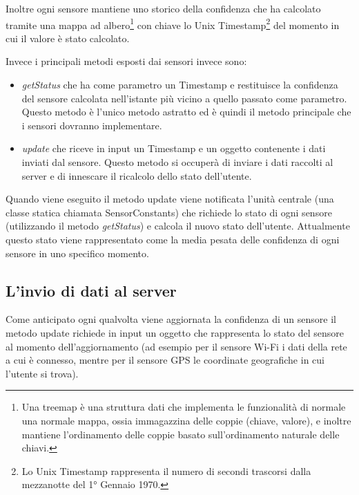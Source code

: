 Inoltre ogni sensore mantiene uno storico della confidenza che ha calcolato tramite una mappa ad albero\footnote{Una treemap è una struttura dati che implementa le funzionalità di normale una normale mappa, ossia immagazzina delle coppie (chiave, valore), e inoltre mantiene l'ordinamento delle coppie basato sull'ordinamento naturale delle chiavi.} con chiave lo Unix Timestamp\footnote{Lo Unix Timestamp rappresenta il numero di secondi trascorsi dalla mezzanotte del 1° Gennaio 1970.} del momento in cui il valore è stato calcolato.

Invece i principali metodi esposti dai sensori invece sono:
\begin{itemize}
    \item \textit{getStatus} che ha come parametro un Timestamp e restituisce la confidenza del sensore calcolata nell'istante più vicino a quello passato come parametro. Questo metodo è l'unico metodo astratto ed è quindi il metodo principale che i sensori dovranno implementare.
    \item \textit{update} che riceve in input un Timestamp e un oggetto contenente i dati inviati dal sensore. Questo metodo si occuperà di inviare i dati raccolti al server e di innescare il ricalcolo dello stato dell'utente.
\end{itemize}
Quando viene eseguito il metodo update viene notificata l'unità centrale (una classe statica chiamata SensorConstants) che richiede lo stato di ogni sensore (utilizzando il metodo \textit{getStatus}) e calcola il nuovo stato dell'utente. Attualmente questo stato viene rappresentato come la media pesata delle confidenza di ogni sensore in uno specifico momento.

\subsection{L'invio di dati al server}
Come anticipato ogni qualvolta viene aggiornata la confidenza di un sensore il metodo update richiede in input un oggetto che rappresenta lo stato del sensore al momento dell'aggiornamento (ad esempio per il sensore Wi-Fi i dati della rete a cui è connesso, mentre per il sensore GPS le coordinate geografiche in cui l'utente si trova). 

